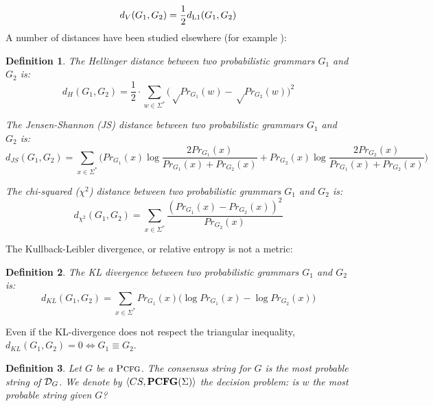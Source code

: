 \documentclass[submission]{eptcs} \usepackage{breakurl}             \usepackage[english]{babel}
\newtheorem{definition}{Definition}
\providecommand{\PCFGclass}{\textup{\textbf{PCFG}(\ensuremath{\Sigma})}}
\providecommand{\Lone}{\textup{L1}}
\providecommand{\PCFG}{\ensuremath{\textsc{Pcfg}}}
\providecommand{\Prob}{\ensuremath{Pr}}
\providecommand{\Dis}{\ensuremath{{\cal{D}}}}
\begin{document}
\begin{equation}\label{equation:variation}
d_{V}(G_1,G_2)=\frac{1}{2}d_{\Lone}(G_1,G_2)
\end{equation}
A number of distances have been studied elsewhere (for example \cite{jago01,cort07}):
\begin{definition}
The \emph{Hellinger distance} between two probabilistic grammars $G_1$ and $G_2$ is:
\begin{equation*}
d_{H}(G_1,G_2)=\frac{1}{2}\cdot\sum_{w\in\Sigma^*}\bigg(\sqrt\Prob_{G_1}(w)-\sqrt\Prob_{G_2}(w)\bigg)^2
\end{equation*}

The \emph{Jensen-Shannon (JS)} distance between two probabilistic grammars $G_1$ and $G_2$ is:
\begin{equation*}
d_{JS}(G_1,G_2)=\sum_{x \in \Sigma^*}\bigg(\Prob_{G_1}(x)\log\frac{2\Prob_{G_1}(x)}{\Prob_{G_1}(x)+\Prob_{G_2}(x)} + \Prob_{G_2}(x)\log\frac{2\Prob_{G_2}(x)}{\Prob_{G_1}(x)+\Prob_{G_2}(x)}\bigg)
\end{equation*}

The \emph{chi-squared ($\chi^2$)} distance between two probabilistic grammars $G_1$ and $G_2$ is:
\begin{equation*}
d_{\chi^2}(G_1,G_2) = \sum_{x \in \Sigma^*}\frac{(\Prob_{G_1}(x)-\Prob_{G_2}(x))^2}{\Prob_{G_2}(x)}
\end{equation*}
\end{definition}


The Kullback-Leibler divergence, or relative entropy is not a metric:
\begin{definition}
The KL divergence between two probabilistic grammars $G_1$ and $G_2$ is:
\begin{equation}
d_{KL}(G_1,G_2)=\sum_{x\in\Sigma^*}\Prob_{G_1}(x)\big(\log\Prob_{G_1}(x) - \log\Prob_{G_2}(x)\big)
\end{equation}
\end{definition}
Even if the KL-divergence does not respect the triangular inequality, $d_{KL}(G_1,G_2)=0\iff G_1\equiv G_2$.
\begin{definition}
Let $G$ be a $\PCFG$. The consensus string for $G$ is the most probable string of $\Dis_G$.
We denote by $\langle CS,\PCFGclass\rangle$ the decision problem: is $w$ the most probable string given $G$?
\end{definition}
\end{document}
